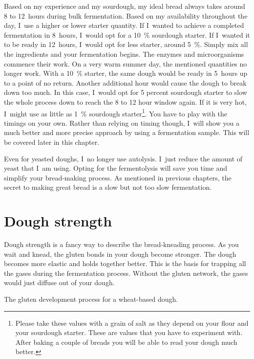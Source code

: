 Based on my experience and my sourdough, my ideal bread always takes around 8
to 12~hours during bulk fermentation. Based on my availability throughout
the day, I~use a higher or lower starter quantity. If I~wanted to achieve a completed
fermentation in 8~hours, I~would opt for a \qty{10}{\percent} sourdough starter. If
I~wanted it to be ready in 12~hours, I~would opt for less starter, around \qty{5}{\percent}.
Simply mix all the ingredients and your fermentation begins. The
enzymes and microorganisms commence their work. On a very warm summer day, the
mentioned quantities no longer work. With a \qty{10}{\percent} starter, the same dough
would be ready in 5~hours up to a point of no return. Another additional hour
would cause the dough to break down too much. In this case, I~would opt for 5
percent sourdough starter to slow the whole process down to reach the 8 to 12
hour window again. If it is very hot, I~might use as little as \qty{1}{\percent}
sourdough starter\footnote{Please take these values with a grain of salt as
they depend on your flour and your sourdough starter. These are values that
you have to experiment with. After baking a couple of breads you will be able
to read your dough much better.}. You have to play with the timings on your own.
Rather than relying on timing though, I~will show you a much better and more precise approach
by using a fermentation sample. This will be covered later in this chapter.

Even for yeasted doughs, I~no longer use autolysis. I~just reduce the amount
of yeast that I~am using. Opting for the fermentolysis will
save you time and simplify your bread-making process. As mentioned in previous chapters,
the secret to making great bread is a slow but not too slow fermentation.

\section{Dough strength}

Dough strength is a fancy way to describe the bread-kneading process. As you wait and
knead, the gluten bonds in your dough become stronger. The dough
becomes more elastic and holds together better. This is the basis for trapping
all the gases during the fermentation process. Without the gluten network,
the gases would just diffuse out of your dough.

\begin{flowchart}[!htb]
\begin{center}
  
  \caption{The gluten development process for a wheat-based dough.}%
  \label{fig:wheat-sourdough-kneading-process}
\end{center}
\end{flowchart}

